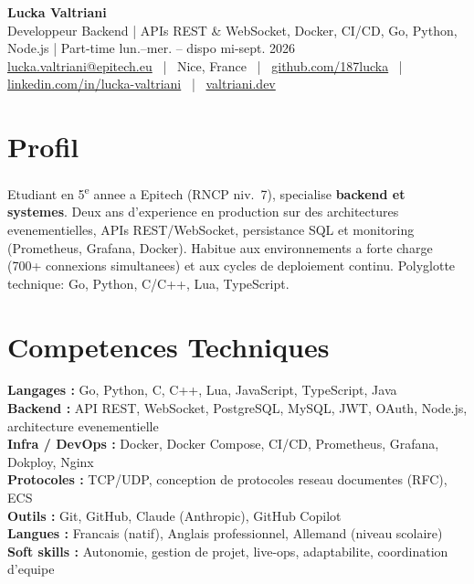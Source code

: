 \documentclass[9pt,a4paper]{article}
\newcommand{\myphone}{}
\begin{document}
\begin{center}
  {\Large\bfseries\color{accent} Lucka Valtriani}\\[3pt]
  {\small\color{gray} Developpeur Backend | APIs REST \& WebSocket, Docker, CI/CD, Go, Python, Node.js | Part-time lun.--mer. -- dispo mi-sept. 2026}\\[5pt]
  {\footnotesize
    \myphone\href{mailto:lucka.valtriani@epitech.eu}{lucka.valtriani@epitech.eu}
    ~|~ Nice, France
    ~|~ \href{https://github.com/187lucka}{github.com/187lucka}
    ~|~ \href{https://www.linkedin.com/in/lucka-valtriani-8a8551258/}{linkedin.com/in/lucka-valtriani}
    ~|~ \href{https://valtriani.dev}{valtriani.dev}
  }
\end{center}

\vspace{5pt}

\section{Profil}
{\small Etudiant en 5\textsuperscript{e} annee a Epitech (RNCP niv.~7), specialise \textbf{backend et systemes}. Deux ans d'experience en production sur des architectures evenementielles, APIs REST/WebSocket, persistance SQL et monitoring (Prometheus, Grafana, Docker). Habitue aux environnements a forte charge (700+ connexions simultanees) et aux cycles de deploiement continu. Polyglotte technique: Go, Python, C/C++, Lua, TypeScript.}

\section{Competences Techniques}
{\small
\noindent\textbf{Langages :} Go, Python, C, C++, Lua, JavaScript, TypeScript, Java\\[2pt]
\noindent\textbf{Backend :} API REST, WebSocket, PostgreSQL, MySQL, JWT, OAuth, Node.js, architecture evenementielle\\[2pt]
\noindent\textbf{Infra / DevOps :} Docker, Docker Compose, CI/CD, Prometheus, Grafana, Dokploy, Nginx\\[2pt]
\noindent\textbf{Protocoles :} TCP/UDP, conception de protocoles reseau documentes (RFC), ECS\\[2pt]
\noindent\textbf{Outils :} Git, GitHub, Claude (Anthropic), GitHub Copilot\\[2pt]
\noindent\textbf{Langues :} Francais (natif), Anglais professionnel, Allemand (niveau scolaire)\\[2pt]
\noindent\textbf{Soft skills :} Autonomie, gestion de projet, live-ops, adaptabilite, coordination d'equipe
}
\end{document}
